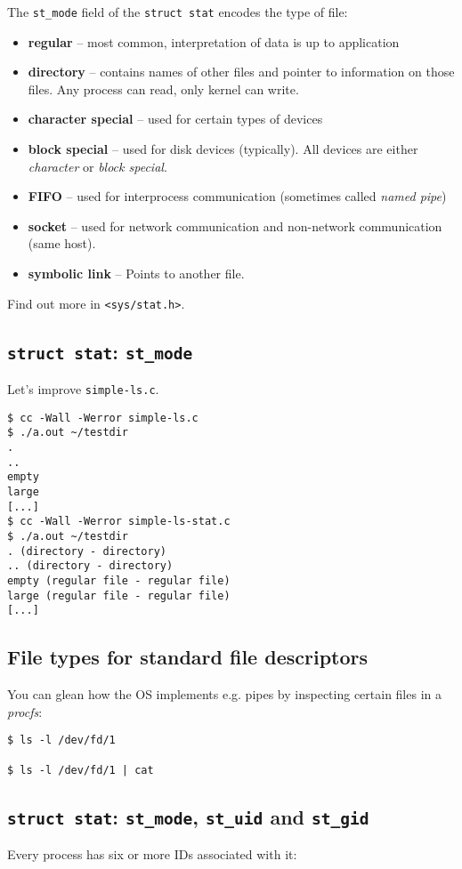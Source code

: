 \documentclass[xga]{xdvislides}
\begin{document}
The {\tt st\_mode} field of the {\tt struct stat} encodes the type of file:

\begin{itemize}
	\item {\bf regular} -- most common, interpretation of data is up to
		application
	\item {\bf directory} -- contains names of other files and pointer to
		information on those files. Any process can read, only kernel
		can write.
	\item {\bf character special} -- used for certain types of devices
	\item {\bf block special} -- used for disk devices (typically). All
		devices are either {\em character} or {\em block special}.
	\item {\bf FIFO} -- used for interprocess communication
		(sometimes called {\em named pipe})
	\item {\bf socket} -- used for network communication and non-network
		communication (same host).
	\item {\bf symbolic link} -- Points to another file.
\end{itemize}
\vspace{.25in}
Find out more in {\tt <sys/stat.h>}.

\subsection{{\tt struct stat}: {\tt st\_mode}}
Let's improve {\tt simple-ls.c}.

\begin{verbatim}
$ cc -Wall -Werror simple-ls.c
$ ./a.out ~/testdir
.
..
empty
large
[...]
$ cc -Wall -Werror simple-ls-stat.c
$ ./a.out ~/testdir
. (directory - directory)
.. (directory - directory)
empty (regular file - regular file)
large (regular file - regular file)
[...]
\end{verbatim}

\subsection{File types for standard file descriptors}
You can glean how the OS implements e.g. pipes by
inspecting certain files in a {\em procfs}:
\begin{verbatim}
$ ls -l /dev/fd/1

$ ls -l /dev/fd/1 | cat
\end{verbatim}

\subsection{{\tt struct stat}: {\tt st\_mode}, {\tt st\_uid} and {\tt st\_gid}}
Every process has six or more IDs associated with it:
\\
\end{document}
